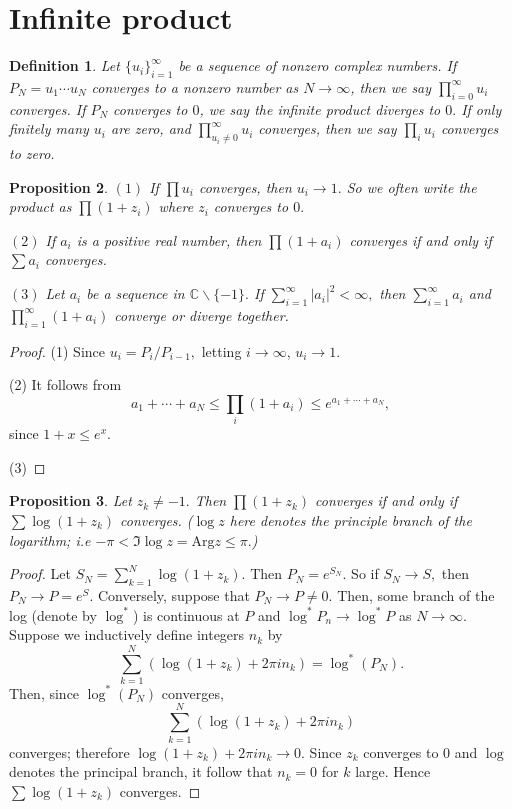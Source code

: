 \documentclass{book}
\newtheorem{defi}{Definition}[section]
\newtheorem{prop}[defi]{Proposition}
\numberwithin{equation}{section}
\begin{document}
\section{Infinite product}
\begin{defi}
Let $\{u_i\}_{i=1}^\infty$ be a sequence of nonzero complex numbers. If $P_N=u_1\cdots u_N$ converges to a nonzero number as $N \rightarrow \infty$, then we say $\prod_{i=0}^\infty u_i$ converges. If $P_N$ converges to $0$, we say the infinite product diverges to $0.$ If only finitely many $u_i$ are zero, and $\prod_{u_i \neq 0}^\infty u_i$ converges, then we say $\prod_i u_i$ converges to zero.
\end{defi}

\begin{prop}
$(1)$ If $\prod u_i$ converges, then $u_i \rightarrow 1.$ So we often write the product as $\prod{(1+z_i)}$ where $z_i$ converges to $0.$\medskip

$(2)$ If ${a_i}$ is a positive real number, then $\prod (1+a_i)$ converges if and only if $\sum a_i$ converges.\medskip

$(3)$ Let $a_i$ be a sequence in $\mathbb{C}\backslash \{-1\}.$ If $\sum_{i=1}^\infty |a_i|^2 <\infty,$ then $\sum_{i=1}^\infty a_i$ and $\prod_{i=1}^\infty (1+a_i)$ converge or diverge together.
\end{prop}
\begin{proof}
(1) Since $u_i= P_i/ P_{i-1},$ letting $i \rightarrow \infty$, $u_i \rightarrow 1.$ \medskip

(2) It follows from 
$$
a_1+\cdots +a_N \leq \prod_i (1+a_i) \leq e^{a_1+\cdots +a_N},
$$ since $1+x\leq e^x.$\medskip

(3)
\end{proof}

\begin{prop}
Let $z_k \neq -1.$ Then $\prod (1+z_k)$ converges if and only if $\sum \log(1+z_k)$ converges. ($\log z$ here denotes the principle branch of the logarithm; i.e $-\pi < \Im \log z= \mathrm{Arg}z \leq \pi.$)
\end{prop}
\begin{proof}
Let $S_N=\sum_{k=1}^N \log (1+z_k).$ Then $P_N=e^{S_N}$. So if $S_N \rightarrow S,$ then $P_N \rightarrow P=e^S.$ Conversely, suppose that $P_N \rightarrow P\neq 0.$ Then, some branch of the log (denote by $\log^*$) is continuous at $P$ and $\log^* P_n \rightarrow \log^* P$ as $N \rightarrow \infty.$ Suppose we inductively define integers $n_k$ by
$$
\sum_{k=1}^N (\log (1+z_k)+2\pi i n_k)=\log^* (P_N).
$$ Then, since $\log^* (P_N)$ converges,
$$
\sum_{k=1}^N (\log (1+z_k)+2\pi i n_k)
$$ converges; therefore $\log (1+z_k)+2\pi i n_k \rightarrow 0$. Since $z_k$ converges to $0$ and $\log$ denotes the principal branch, it follow that $n_k=0$ for $k$ large. Hence $\sum \log(1+z_k)$ converges.
\end{proof}
\end{document}
